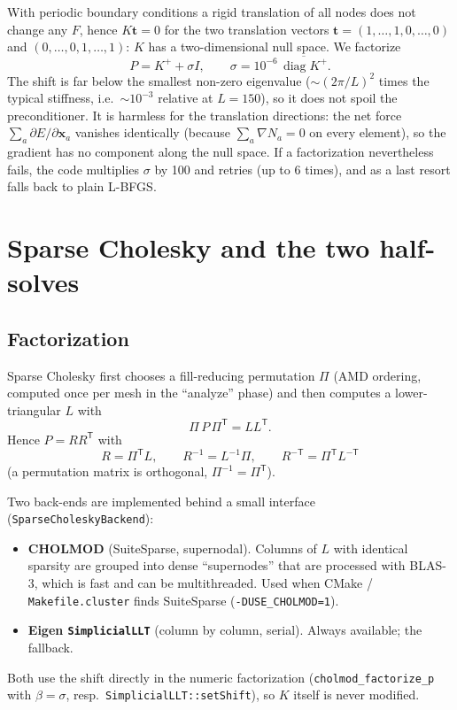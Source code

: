 \documentclass[11pt,a4paper]{article}
\theoremstyle{remark}
\newcommand{\x}{\bm{x}}
\newcommand{\T}{^{\mathsf T}}
\newcommand{\mT}{^{-\mathsf T}}
\newcommand{\code}[1]{\texttt{#1}}
\begin{document}
With periodic boundary conditions a rigid translation of all nodes does not change any $F$,
hence $K\bm{t}=0$ for the two translation vectors $\bm t=(1,\dots,1,0,\dots,0)$ and
$(0,\dots,0,1,\dots,1)$: $K$ has a two-dimensional null space. We factorize
\begin{equation}
P = K^{+} + \sigma I,\qquad \sigma = 10^{-6}\,\overline{\operatorname{diag}K^{+}} .
\end{equation}
The shift is far below the smallest non-zero eigenvalue ($\sim(2\pi/L)^2$ times the typical
stiffness, i.e.\ $\sim10^{-3}$ relative at $L=150$), so it does not spoil the preconditioner.
It is harmless for the translation directions: the net force $\sum_a \partial E/\partial\x_a$
vanishes identically (because $\sum_a\nabla N_a=0$ on every element), so the gradient has no
component along the null space. If a factorization nevertheless fails, the code multiplies
$\sigma$ by 100 and retries (up to 6 times), and as a last resort falls back to plain L-BFGS.

\section{Sparse Cholesky and the two half-solves}
\label{sec:cholesky}

\subsection{Factorization}

Sparse Cholesky first chooses a fill-reducing permutation $\Pi$ (AMD ordering, computed once
per mesh in the ``analyze'' phase) and then computes a lower-triangular $L$ with
\begin{equation}
\Pi\,P\,\Pi\T = L L\T .
\end{equation}
Hence $P = R R\T$ with
\begin{equation}
R = \Pi\T L,\qquad R^{-1} = L^{-1}\Pi,\qquad R\mT = \Pi\T L\mT
\end{equation}
(a permutation matrix is orthogonal, $\Pi^{-1}=\Pi\T$).

Two back-ends are implemented behind a small interface (\code{SparseCholeskyBackend}):
\begin{itemize}[leftmargin=*]
\item \textbf{CHOLMOD} (SuiteSparse, supernodal). Columns of $L$ with identical sparsity are
grouped into dense ``supernodes'' that are processed with BLAS-3, which is fast and can be
multithreaded. Used when CMake / \code{Makefile.cluster} finds SuiteSparse
(\code{-DUSE\_\allowbreak{}CHOLMOD=1}).
\item \textbf{Eigen \code{SimplicialLLT}} (column by column, serial). Always available; the
fallback.
\end{itemize}
Both use the shift directly in the numeric factorization (\code{cholmod\_\allowbreak{}factorize\_\allowbreak{}p} with
$\beta=\sigma$, resp.\ \code{SimplicialLLT::\allowbreak{}setShift}), so $K$ itself is never modified.
\end{document}
